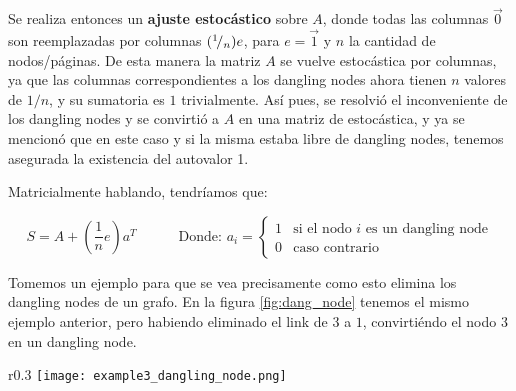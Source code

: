 \par Se realiza entonces un \textbf{ajuste estoc\'astico} sobre $A$, donde todas
las columnas $\vec{0}$ son reemplazadas por columnas
$({}^{1}\!/_{n})e$, para $e = \vec{1}$ y $n$ la cantidad de
nodos/p\'aginas. De esta manera la matriz $A$ se vuelve estoc\'astica por
columnas, ya que las columnas correspondientes a los dangling
nodes ahora tienen $n$ valores de $1/n$, y su sumatoria es $1$ trivialmente.
As\'i pues, se resolvi\'o el inconveniente de los dangling nodes y se
convirti\'o a $A$ en una matriz de estoc\'astica, y ya se mencion\'o que en este
caso y si la misma estaba libre de dangling nodes, tenemos asegurada la
existencia del autovalor 1.

\par Matricialmente hablando, tendr\'iamos que:

\begin{equation}
    S = A + \left(\dfrac{1}{n}e\right)a^T \quad\quad\quad
        \text{Donde: } a_i =
        \begin{cases}
            1 &\text{si el nodo $i$ es un dangling node}\\
            0 &\text{caso contrario}
        \end{cases}\label{eq:S}
\end{equation}
\medskip

\par Tomemos un ejemplo para que se vea precisamente como esto elimina los
dangling nodes de un grafo. En la figura \ref{fig:dang_node} tenemos el mismo
ejemplo anterior, pero habiendo eliminado el link de $3$ a $1$, convirti\'endo
el nodo $3$ en un dangling node.

\begin{wrapfigure}[5]{r}{0.3\textwidth}
    \texttt{[image: example3\_dangling\_node.png]}
    \caption{Dangling Nodes}
    \label{fig:dang_node}
\end{wrapfigure}
\leavevmode

